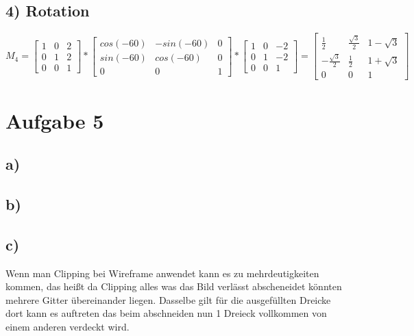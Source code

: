 \documentclass[12pt,pdftex,a4paper]{article}
\begin{document}
\subsection*{4) Rotation}
\[
M_4=
\begin{bmatrix}
1 & 0 & 2\\
0 & 1 & 2\\
0 & 0 & 1
\end{bmatrix}
*
\begin{bmatrix}
cos(-60) & -sin(-60) & 0\\
sin(-60) & cos(-60) & 0\\
0 & 0 & 1
\end{bmatrix}
*
\begin{bmatrix}
1 & 0 & -2\\
0 & 1 & -2\\
0 & 0 & 1
\end{bmatrix}
=
\begin{bmatrix}
\frac{1}{2} & \frac{\sqrt{3}}{2} & 1-\sqrt{3}\\
-\frac{\sqrt{3}}{2} & \frac{1}{2} & 1+\sqrt{3}\\
0 & 0 & 1

\end{bmatrix}
\]

\section*{Aufgabe 5}
\subsection*{a)}


\subsection*{b)}


\subsection*{c)}
Wenn man Clipping bei Wireframe anwendet kann es zu mehrdeutigkeiten kommen, das heißt da  Clipping alles was das Bild verlässt abscheneidet könnten mehrere Gitter übereinander liegen. Dasselbe gilt für die ausgefüllten Dreicke dort kann es auftreten das beim abschneiden nun 1 Dreieck vollkommen von einem anderen verdeckt wird.
\end{document}
